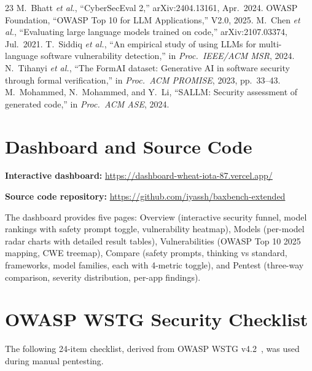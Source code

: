 \documentclass[conference,a4paper]{IEEEtran}
\begin{document}
\begin{thebibliography}{23}
 M.~Bhatt \emph{et al.}, ``CyberSecEval 2,'' arXiv:2404.13161, Apr.\ 2024.
 OWASP Foundation, ``OWASP Top 10 for LLM Applications,'' V2.0, 2025.
 M.~Chen \emph{et al.}, ``Evaluating large language models trained on code,'' arXiv:2107.03374, Jul.\ 2021.
 T.~Siddiq \emph{et al.}, ``An empirical study of using LLMs for multi-language software vulnerability detection,'' in \emph{Proc.\ IEEE/ACM MSR}, 2024.
 N.~Tihanyi \emph{et al.}, ``The FormAI dataset: Generative AI in software security through formal verification,'' in \emph{Proc.\ ACM PROMISE}, 2023, pp.~33--43.
 M.~Mohammed, N.~Mohammed, and Y.~Li, ``SALLM: Security assessment of generated code,'' in \emph{Proc.\ ACM ASE}, 2024.
\end{thebibliography}

\onecolumn
\appendices

\section{Dashboard and Source Code}
\noindent\textbf{Interactive dashboard:} \url{https://dashboard-wheat-iota-87.vercel.app/}

\noindent\textbf{Source code repository:} \url{https://github.com/iyassh/baxbench-extended}

\medskip\noindent The dashboard provides five pages: Overview (interactive security funnel, model rankings with safety prompt toggle, vulnerability heatmap), Models (per-model radar charts with detailed result tables), Vulnerabilities (OWASP Top 10 2025 mapping, CWE treemap), Compare (safety prompts, thinking vs standard, frameworks, model families, each with 4-metric toggle), and Pentest (three-way comparison, severity distribution, per-app findings).

\section{OWASP WSTG Security Checklist}
The following 24-item checklist, derived from OWASP WSTG v4.2~\cite{wstg}, was used during manual pentesting.
\end{document}
